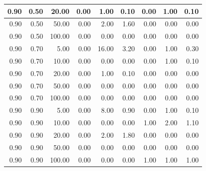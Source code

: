 \documentclass{bmstu}
\begin{document}
\begin{longtable}{|r|r|r|r|r|r|r|r|r|}
0.90 & 0.50 & 20.00 & 0.00 & 1.00 & 0.10 & 0.00 & 1.00 & 0.10 \\ \hline
0.90 & 0.50 & 50.00 & 0.00 & 2.00 & 1.60 & 0.00 & 0.00 & 0.00 \\ \hline
0.90 & 0.50 & 100.00 & 0.00 & 0.00 & 0.00 & 0.00 & 0.00 & 0.00 \\ \hline
0.90 & 0.70 & 5.00 & 0.00 & 16.00 & 3.20 & 0.00 & 1.00 & 0.30 \\ \hline
0.90 & 0.70 & 10.00 & 0.00 & 0.00 & 0.00 & 0.00 & 1.00 & 0.10 \\ \hline
0.90 & 0.70 & 20.00 & 0.00 & 1.00 & 0.10 & 0.00 & 0.00 & 0.00 \\ \hline
0.90 & 0.70 & 50.00 & 0.00 & 0.00 & 0.00 & 0.00 & 0.00 & 0.00 \\ \hline
0.90 & 0.70 & 100.00 & 0.00 & 0.00 & 0.00 & 0.00 & 0.00 & 0.00 \\ \hline
0.90 & 0.90 & 5.00 & 0.00 & 8.00 & 0.90 & 0.00 & 1.00 & 0.10 \\ \hline
0.90 & 0.90 & 10.00 & 0.00 & 0.00 & 0.00 & 1.00 & 2.00 & 1.10 \\ \hline
0.90 & 0.90 & 20.00 & 0.00 & 2.00 & 1.80 & 0.00 & 0.00 & 0.00 \\ \hline
0.90 & 0.90 & 50.00 & 0.00 & 0.00 & 0.00 & 0.00 & 0.00 & 0.00 \\ \hline
0.90 & 0.90 & 100.00 & 0.00 & 0.00 & 0.00 & 1.00 & 1.00 & 1.00 \\ \hline
\end{longtable}
\end{document}
